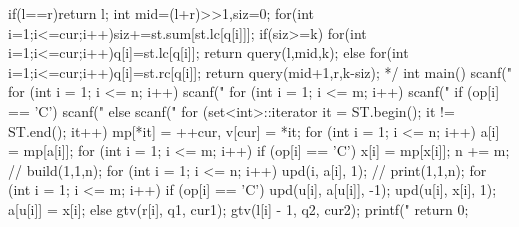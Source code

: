 \begin{cppcode}
{
    if(l==r)return l;
    int mid=(l+r)>>1,siz=0;
    for(int i=1;i<=cur;i++)siz+=st.sum[st.lc[q[i]]];
    if(siz>=k)
    {
        for(int i=1;i<=cur;i++)q[i]=st.lc[q[i]];
        return query(l,mid,k);
    }
    else
    {
        for(int i=1;i<=cur;i++)q[i]=st.rc[q[i]];
        return query(mid+1,r,k-siz);
    }
}
*/
int main() {
  scanf("%
  for (int i = 1; i <= n; i++) scanf("%
  for (int i = 1; i <= m; i++) {
    scanf(" %
    if (op[i] == 'C')
      scanf("%
    else
      scanf("%
  }
  for (set<int>::iterator it = ST.begin(); it != ST.end(); it++)
    mp[*it] = ++cur, v[cur] = *it;
  for (int i = 1; i <= n; i++) a[i] = mp[a[i]];
  for (int i = 1; i <= m; i++)
    if (op[i] == 'C') x[i] = mp[x[i]];
  n += m;
  // build(1,1,n);
  for (int i = 1; i <= n; i++) upd(i, a[i], 1);
  // print(1,1,n);
  for (int i = 1; i <= m; i++) {
    if (op[i] == 'C') {
      upd(u[i], a[u[i]], -1);
      upd(u[i], x[i], 1);
      a[u[i]] = x[i];
    } else {
      gtv(r[i], q1, cur1);
      gtv(l[i] - 1, q2, cur2);
      printf("%
    }
  }
  return 0;
}
\end{cppcode}
